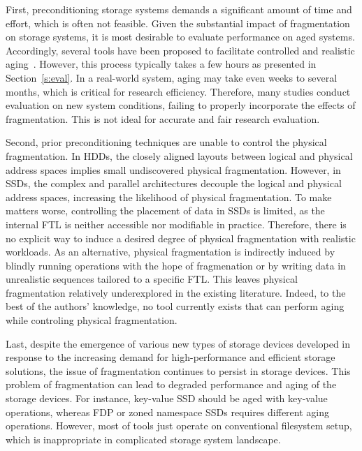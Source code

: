 First, preconditioning storage systems demands a significant amount of time and effort, which is often not feasible.
Given the substantial impact of fragmentation on storage systems, it is most desirable to evaluate performance on aged systems.
Accordingly, several tools have been proposed to facilitate controlled and realistic aging~\cite{tools,studies}.
However, this process typically takes a few hours as presented in Section~\ref{s:eval}.
In a real-world system, aging may take even weeks to several months, which is critical for research efficiency.
Therefore, many studies conduct evaluation on new system conditions, failing to properly incorporate the effects of fragmentation.
This is not ideal for accurate and fair research evaluation.


Second, prior preconditioning techniques are unable to control the physical fragmentation.
In HDDs, the closely aligned layouts between logical and physical address spaces implies small undiscovered physical fragmentation.
However, in SSDs, the complex and parallel architectures decouple the logical and physical address spaces, increasing the likelihood of physical fragmentation.
To make matters worse, controlling the placement of data in SSDs is limited, as the internal FTL is neither accessible nor modifiable in practice.
Therefore, there is no explicit way to induce a desired degree of physical fragmentation with realistic workloads.
As an alternative, physical fragmentation is indirectly induced by blindly running operations with the hope of fragmenation or by writing data in unrealistic sequences tailored to a specific FTL.
This leaves physical fragmentation relatively underexplored in the existing literature.
Indeed, to the best of the authors' knowledge, no tool currently exists that can perform aging while controling physical fragmentation.


Last, despite the emergence of various new types of storage devices developed in response to the increasing demand for high-performance and efficient storage solutions, the issue of fragmentation continues to persist in storage devices.
This problem of fragmentation can lead to degraded performance and aging of the storage devices.
For instance, key-value SSD should be aged with key-value operations, whereas FDP or zoned namespace SSDs requires different aging operations.
However, most of tools just operate on conventional filesystem setup, which is inappropriate in complicated storage system landscape.


